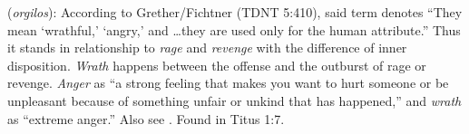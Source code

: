 \item[Wrath,]

(\textit{orgilos}):
According to Grether/Fichtner (TDNT 5:410), said term denotes ``They mean `wrathful,' `angry,' and \ldots they are used only for the human attribute.'' Thus it stands in relationship to \emph{rage} and \emph{revenge} with the difference of inner disposition. \emph{Wrath} happens between the offense and the outburst of rage or revenge. \emph{Anger} as ``a strong feeling that makes you want to hurt someone or be unpleasant because of something unfair or unkind that has happened,'' and \emph{wrath} as ``extreme anger.'' Also see .
Found in Titus 1:7.
